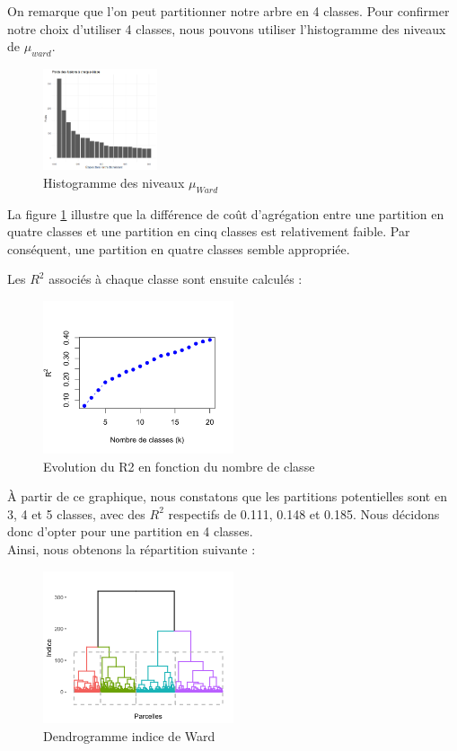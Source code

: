 \documentclass{article}
\begin{document}
On remarque que l'on peut partitionner notre arbre en 4 classes.
Pour confirmer notre choix d’utiliser 4 classes, nous pouvons utiliser l’histogramme des niveaux de $\mu_{ward}$.
\begin{figure}[H]
    \centering
    \includegraphics[width=0.3\textwidth]{histoward.png}
    \caption{Histogramme des niveaux $\mu_{Ward}$}
    \label{fig:HWard} 
\end{figure}

La figure \ref{fig:HWard} illustre que la différence de coût d'agrégation entre une partition en quatre classes et une partition en cinq classes est relativement faible. Par conséquent, une partition en quatre classes semble appropriée. 

Les \( R^2 \) associés à chaque classe sont ensuite calculés :

\begin{figure}[H]
    \centering
    \includegraphics[width=0.5\textwidth]{R222.png}
    \caption{Evolution du R2 en fonction du nombre de classe}
    \label{fig:EvolR2} 
\end{figure}
À partir de ce graphique, nous constatons que les partitions potentielles sont en 3, 4 et 5 classes, avec des \( R^2 \) respectifs de 0.111, 0.148 et 0.185. Nous décidons donc d'opter pour une partition en 4 classes.
\\
Ainsi, nous obtenons la répartition suivante :
\begin{figure}[H]
    \centering
    \includegraphics[width=0.5\textwidth]{wardcouleur.png}
    \caption{Dendrogramme indice de Ward}
    \label{fig:Ward_couleur} 
\end{figure}
\end{document}
